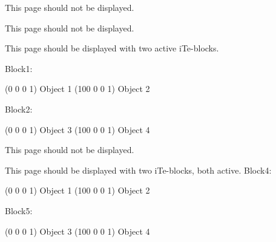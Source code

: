 \documentclass{article}
\begin{document}
This page should not be displayed.

\newpage

This page should not be displayed.

\newpage

This page should be displayed with two active iTe-blocks.

Block1:\medbreak
\begin{iteblock}
\ITE(0 0 0 1) Object 1
\ITE(100 0 0 1) Object 2
\end{iteblock}



Block2:\medbreak
\begin{iteblock}
\ITE(0 0 0 1) Object 3
\ITE(100 0 0 1) Object 4
\end{iteblock}

\newpage

This page should not be displayed.

\newpage

This page should be displayed with two iTe-blocks, both active.
\medbreak
Block4:\medbreak
\begin{iteblock}
\ITE(0 0 0 1) Object 1
\ITE(100 0 0 1) Object 2
\end{iteblock}


Block5:\medbreak
\begin{iteblock}
\ITE(0 0 0 1) Object 3
\ITE(100 0 0 1) Object 4
\end{iteblock}
\end{document}
